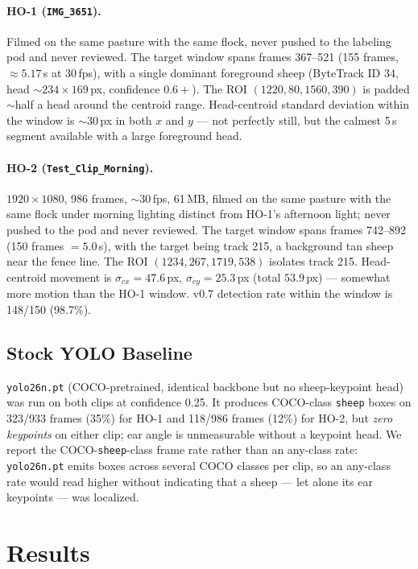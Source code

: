 \documentclass[11pt]{article}
\begin{document}
\paragraph{HO-1 (\texttt{IMG\_3651}).}
Filmed on the same pasture with the same flock, never pushed to the labeling pod
and never reviewed. The target window spans frames 367--521 (155 frames,
$\approx 5.17$\,s at 30\,fps), with a single dominant foreground sheep
(ByteTrack ID 34, head ${\sim}234\times169$\,px, confidence $0.6{+}$). The ROI
$(1220, 80, 1560, 390)$ is padded ${\sim}$half a head around the centroid range.
Head-centroid standard deviation within the window is ${\sim}30$\,px in both $x$
and $y$ --- not perfectly still, but the calmest 5\,s segment available with a
large foreground head.

\paragraph{HO-2 (\texttt{Test\_Clip\_Morning}).}
$1920\times1080$, 986 frames, ${\sim}30$\,fps, 61\,MB, filmed on the same pasture
with the same flock under morning lighting distinct from HO-1's afternoon
light; never pushed to the pod and never reviewed. The target window spans
frames 742--892 (150 frames $=5.0$\,s), with the target being track 215, a
background tan sheep near the fence line. The ROI $(1234, 267, 1719, 538)$
isolates track 215. Head-centroid movement is $\sigma_{cx}=47.6$\,px,
$\sigma_{cy}=25.3$\,px (total $53.9$\,px) --- somewhat more motion than the
HO-1 window. v0.7 detection rate within the window is 148/150 (98.7\%).

\subsection{Stock YOLO Baseline}
\label{sec:stock}
\texttt{yolo26n.pt} (COCO-pretrained, identical backbone but no sheep-keypoint
head) was run on both clips at confidence 0.25. It produces COCO-class
\texttt{sheep} boxes on 323/933 frames (35\%) for HO-1 and 118/986 frames
(12\%) for HO-2, but \emph{zero keypoints} on either clip; ear angle is
unmeasurable without a keypoint head. We report the COCO-\texttt{sheep}-class
frame rate rather than an any-class rate: \texttt{yolo26n.pt} emits boxes across
several COCO classes per clip, so an any-class rate would read higher without
indicating that a sheep --- let alone its ear keypoints --- was localized.

\section{Results}
\end{document}

